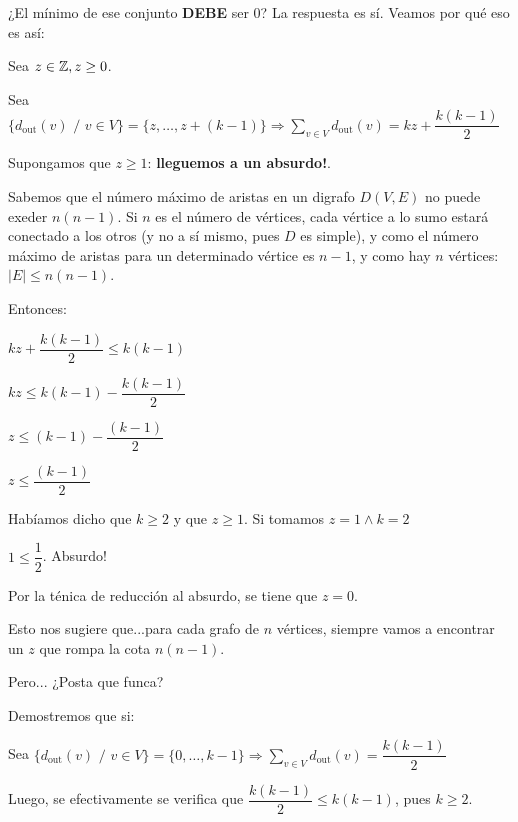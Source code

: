 \documentclass[12pt,a4paper]{article}
\begin{document}
\demoline
\par ¿El mínimo de ese conjunto \textbf{DEBE} ser 0? La respuesta es sí. Veamos por qué eso es así:
\par Sea \ensuremath{z \in \entt, z \geq 0}.
\par Sea \ensuremath{\{d_\text{out}(v)\text{ / } v \in V\} = \{z, \dots, z + (k - 1)\} \Rightarrow \sum_{v \in V}{d_\text{out}(v)} = kz  + \dfrac{k(k - 1)}{2}}
\par Supongamos que \ensuremath{z \geq 1}: \textbf{lleguemos a un absurdo!}.
\par Sabemos que el número máximo de aristas en un digrafo \ensuremath{D(V, E)} no puede exeder \ensuremath{n(n - 1)}. Si \ensuremath{n} es el número de vértices, cada vértice a lo sumo estará conectado a los otros (y no a sí mismo, pues \ensuremath{D} es simple), y como el número máximo de aristas para un determinado vértice es \ensuremath{n - 1}, y como hay \ensuremath{n} vértices: \ensuremath{|E| \leq n(n - 1)}.
\par Entonces:
\par \ensuremath{kz + \dfrac{k(k - 1)}{2} \leq k(k - 1)}
\par \ensuremath{kz \leq k(k - 1) - \dfrac{k(k - 1)}{2}}
\par \ensuremath{z \leq (k - 1) - \dfrac{(k - 1)}{2}}
\par \ensuremath{z \leq \dfrac{(k - 1)}{2}}
\par Habíamos dicho que \ensuremath{k \geq 2} y que \ensuremath{z \geq 1}. Si tomamos \ensuremath{z = 1 \land k = 2} 
\par \ensuremath{1 \leq \dfrac{1}{2}}. Absurdo!
\par Por la ténica de reducción al absurdo, se tiene que \ensuremath{z = 0}.
\demoline
\par Esto nos sugiere que...para cada grafo de \ensuremath{n} vértices, siempre vamos a encontrar un \ensuremath{z} que rompa la cota \ensuremath{n(n-1)}. 
\demoline
\demoline
\demoline
\demoline
\par Pero... ¿Posta que funca?
\par Demostremos que si:
\demoline
\par 
\par Sea \ensuremath{\{d_\text{out}(v)\text{ / } v \in V\} = \{0, \dots, k - 1\} \Rightarrow \sum_{v \in V}{d_\text{out}(v)} = \dfrac{k(k - 1)}{2}}
\par Luego, se efectivamente se verifica que \ensuremath{\dfrac{k(k - 1)}{2} \leq k(k - 1)}, pues \ensuremath{k \geq 2}.
\end{document}
